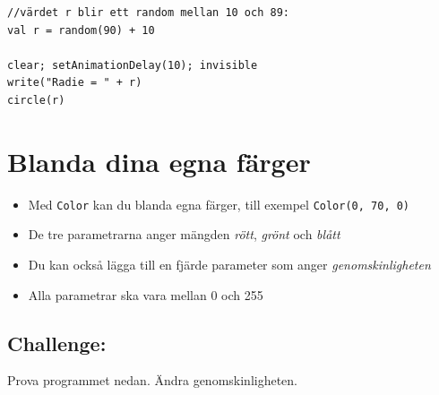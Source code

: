   

\begin{lstlisting}[basicstyle={\ttfamily\fontsize{20}{24}\selectfont},numbers=none]
//värdet r blir ett random mellan 10 och 89:
val r = random(90) + 10   

clear; setAnimationDelay(10); invisible
write("Radie = " + r)
circle(r)
\end{lstlisting}
        
\chapter{Blanda dina egna färger}

\begin{itemize}

\item {Med \lstinline{Color} kan du blanda egna färger, till exempel \lstinline{Color(0, 70, 0)}}
\item {De tre parametrarna anger mängden {\it rött}, {\it grönt} och {\it blått}}
\item {Du kan också lägga till en fjärde parameter som anger {\it genomskinligheten}}
\item {Alla parametrar ska vara mellan 0 och 255}

\end{itemize}


\section*{\color{BrickRed}Challenge:}
Prova programmet nedan. Ändra genomskinligheten.

